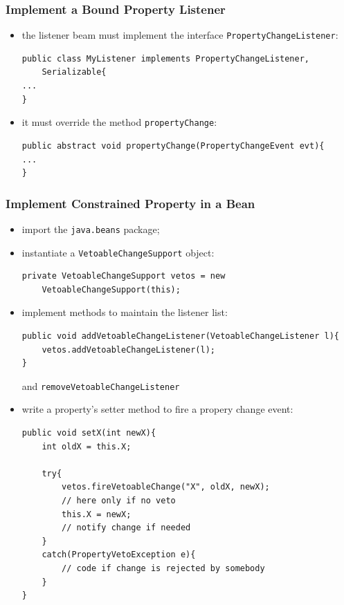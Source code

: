\subsubsection{Implement a Bound Property Listener}
\begin{itemize}
    \item the listener beam must implement the interface \verb|PropertyChangeListener|:
    \begin{verbatim}
public class MyListener implements PropertyChangeListener,
    Serializable{
...
}
    \end{verbatim}

    \item it must override the method \verb|propertyChange|:
    \begin{verbatim}
public abstract void propertyChange(PropertyChangeEvent evt){
...
}
    \end{verbatim}
\end{itemize}

\subsubsection{Implement Constrained Property in a Bean}
\begin{itemize}
    \item import the \verb|java.beans| package;

    \item instantiate a \verb|VetoableChangeSupport| object:
    \begin{verbatim}
private VetoableChangeSupport vetos = new 
    VetoableChangeSupport(this);
    \end{verbatim}

    \item implement methods to maintain the listener list:
    \begin{verbatim}
public void addVetoableChangeListener(VetoableChangeListener l){
    vetos.addVetoableChangeListener(l);
}
    \end{verbatim}
    and \verb|removeVetoableChangeListener|

    \item write a property's setter method to fire a propery change event:
    \begin{verbatim}
public void setX(int newX){
    int oldX = this.X;
    
    try{
        vetos.fireVetoableChange("X", oldX, newX);
        // here only if no veto
        this.X = newX;
        // notify change if needed
    }
    catch(PropertyVetoException e){
        // code if change is rejected by somebody
    }
}
    \end{verbatim}
\end{itemize}

